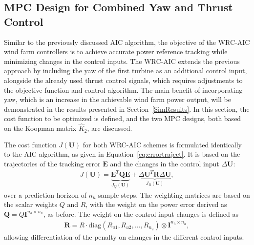 \subsection{MPC Design for Combined Yaw and Thrust Control} \label{qLMPCDesign} 
Similar to the previously discussed AIC algorithm, the objective of the WRC-AIC wind farm controllers is to achieve accurate power reference tracking while minimizing changes in the control inputs. The WRC-AIC extends the previous approach by including the yaw of the first turbine as an additional control input, alongside the already used thrust control signals, which requires adjustments to the objective function and control algorithm. The main benefit of incorporating yaw, which is an increase in the achievable wind farm power output, will be demonstrated in the results presented in Section~\ref{SimResults}. In this section, the cost function to be optimized is defined, and the two MPC designs, both based on the Koopman matrix $\hat{K}_2$, are discussed.

The cost function $J(\bm{U})$ for both WRC-AIC schemes is formulated identically to the AIC algorithm, as given in Equation~\eqref{eq:errortraject}. It is based on the trajectories of the tracking error $\bm{E}$ and the changes in the control input $\Delta \bm{U}$:
\begin{align*} 
    J(\bm{U}) = \underbrace{\bm{E}^T \bm{Q} \bm{E}}_{J_Q (\bm{U})} + \underbrace{\Delta \bm{U}^T \bm{R} \Delta \bm{U}}_{J_R (\bm{U})},
\end{align*}
over a prediction horizon of $n_h$ sample steps. The weighting matrices are based on the scalar weights $Q$ and $R$, with the weight on the power error derived as $\bm{Q} = Q \bm{I}^{n_h \times n_h}$, as before. The weight on the control input changes is defined as
\begin{align*}
    \bm{R} = R \cdot \mathrm{diag}(R_{u1}, R_{u2}, \dots, R_{n_u}) \otimes \bm{I}^{n_h \times n_h},
\end{align*}
allowing differentiation of the penalty on changes in the different control inputs.

